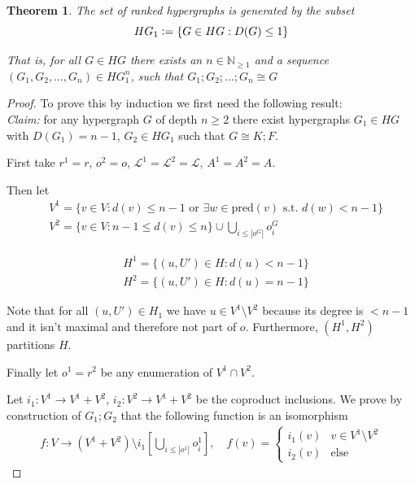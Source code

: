 \documentclass[12pt]{article}
\newtheorem{theorem}{Theorem}[section]
\theoremstyle{definition}
\newcommand{\defeq}{\vcentcolon=}
\newcommand{\N}{\mathbb{N}}
\newcommand{\1}{\mathbbm{1}}
\renewcommand{\L}{\mathcal{L}}
\newcommand{\seq}{;}
\newcommand{\pred}{\text{pred}}
\begin{document}
\begin{theorem}
    The set of ranked hypergraphs is generated by the subset $$HG_1 \defeq \{G\in HG : D(G) \leq 1\}$$

    That is, for all $G\in HG$ there exists an $n\in \N_{\geq 1}$ and a sequence $(G_1, G_2, \dots, G_n)\in HG_1^n$, such that $G_1;G_2;\dots;G_n \cong G$
\end{theorem} %

\begin{proof}
    To prove this by induction we first need the following result:\\
    \emph{Claim:} for any hypergraph $G$ of depth $n \geq 2$ there exist hypergraphs $G_{1}\in HG$ with $D(G_1) = n-1$, $G_{2}\in HG_1$ such that $G \cong K\seq F$.

    First take $r^{1} = r$, $o^{2} = o$, $\L^{1} = \L^{2} = \L$, $A^{1} = A^{2} = A$.

    Then let
    \begin{align*}
        &V^1 = \{v\in V : d(v) \leq n-1 \text{ or } \exists w\in \pred(v) \text{ s.t. } d(w) < n-1\}\\
        &V^2 = \{v\in V : n-1 \leq d(v) \leq n\} \cup \bigcup_{i\leq |o^G|} o^G_i
    \end{align*}

    \begin{align*}
        &H^1 = \{(u,U')\in H : d(u) < n-1\}\\
        &H^2 = \{(u, U')\in H : d(u) = n-1\}
    \end{align*}

    Note that for all $(u,U') \in H_1$ we have $u\in V^1\setminus V^2$ because its degree is $< n-1$ and it isn't maximal and therefore not part of $o$. Furthermore, $(H^1, H^2)$ partitions $H$.

    Finally let $o^1 = r^2$ be any enumeration of $V^1\cap V^2$. 

    Let $i_1: V^1\to V^1 + V^2$, $i_2: V^2\to V^1 + V^2$ be the coproduct inclusions. We prove by construction of $G_1;G_2$ that the following function is an isomorphism
    \begin{align*}
        f: V\to (V^1 + V^2)\setminus i_1[\bigcup_{i\leq |o^1|}o^1_i], \quad f(v) = \begin{cases}
            i_1(v) & v\in V^1\setminus V^2\\
            i_2(v) & \text{else}
        \end{cases}
    \end{align*}


\end{proof}
\end{document}
